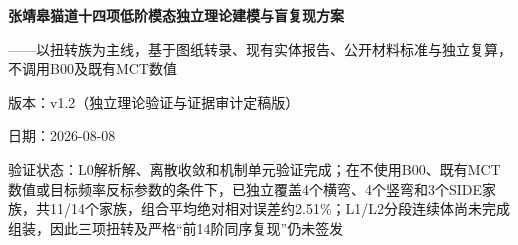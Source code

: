 \documentclass[UTF8,a4paper,11pt,fontset=none]{ctexart}
\begin{document}
\hypersetup{pageanchor=false}
\begin{titlepage}
\centering
\vspace*{0.16\textheight}
{\fontsize{24pt}{34pt}\selectfont\bfseries 张靖皋猫道十四项低阶模态独立理论建模与盲复现方案\par}
\vspace{1.4em}
{\fontsize{14pt}{22pt}\selectfont ——以扭转族为主线，基于图纸转录、现有实体报告、公开材料标准与独立复算，不调用B00及既有MCT数值\par}
\vfill
\begin{minipage}{0.88\textwidth}
\centering
版本：v1.2（独立理论验证与证据审计定稿版）\par
日期：2026-08-08\par
验证状态：L0解析解、离散收敛和机制单元验证完成；在不使用B00、既有MCT数值或目标频率反标参数的条件下，已独立覆盖4个横弯、4个竖弯和3个SIDE家族，共11/14个家族，组合平均绝对相对误差约2.51\%；L1/L2分段连续体尚未完成组装，因此三项扭转及严格“前14阶同序复现”仍未签发\par
\end{minipage}
\vspace*{0.10\textheight}
\end{titlepage}
\tableofcontents
\clearpage
{}
\setcounter{page}{1}
\hypersetup{pageanchor=true}
\end{document}
